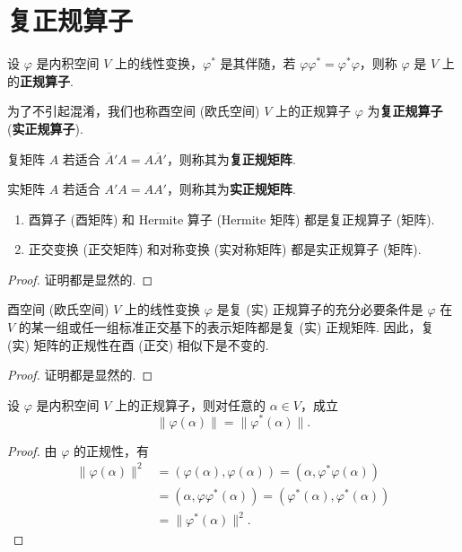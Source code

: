 \documentclass[../../main.tex]{subfiles}
\begin{document}
\section{复正规算子}

\begin{definition}[正规算子和正规矩阵]
设 $\varphi$ 是内积空间 $V$ 上的线性变换，$\varphi^*$ 是其伴随，若 $\varphi\varphi^* = \varphi^*\varphi$，则称 $\varphi$ 是 $V$ 上的\textbf{正规算子}. 

为了不引起混淆，我们也称酉空间 (欧氏空间) $V$ 上的正规算子 $\varphi$ 为\textbf{复正规算子} (\textbf{实正规算子}). 

复矩阵 $A$ 若适合 $\overline{A}'A = A\overline{A}'$，则称其为\textbf{复正规矩阵}. 

实矩阵 $A$ 若适合 $A'A = AA'$，则称其为\textbf{实正规矩阵}.
\end{definition}

\begin{proposition}\label{proposition:常见的正规矩阵}
\begin{enumerate}
\item 酉算子 (酉矩阵) 和 Hermite 算子 (Hermite 矩阵) 都是复正规算子 (矩阵).

\item 正交变换 (正交矩阵) 和对称变换 (实对称矩阵) 都是实正规算子 (矩阵).
\end{enumerate}
\end{proposition}
\begin{proof}
证明都是显然的.
\end{proof}

\begin{theorem}
酉空间 (欧氏空间) $V$ 上的线性变换 $\varphi$ 是复 (实) 正规算子的充分必要条件是 $\varphi$ 在 $V$ 的某一组或任一组标准正交基下的表示矩阵都是复 (实) 正规矩阵. 因此，复 (实) 矩阵的正规性在酉 (正交) 相似下是不变的. 
\end{theorem}
\begin{proof}
证明都是显然的.
\end{proof}

\begin{lemma}\label{lemma:正规算子与伴随的像的范数相同}
设 $\varphi$ 是内积空间 $V$ 上的正规算子，则对任意的 $\alpha \in V$，成立
\[
\|\varphi(\alpha)\| = \|\varphi^*(\alpha)\|.
\]
\end{lemma}
\begin{proof}
由 $\varphi$ 的正规性，有
\begin{align*}
\|\varphi(\alpha)\|^2 &= (\varphi(\alpha),\varphi(\alpha)) = (\alpha,\varphi^*\varphi(\alpha))\\
&= (\alpha,\varphi\varphi^*(\alpha)) = (\varphi^*(\alpha),\varphi^*(\alpha))\\
&= \|\varphi^*(\alpha)\|^2. 
\end{align*}
\end{proof}
\end{document}
